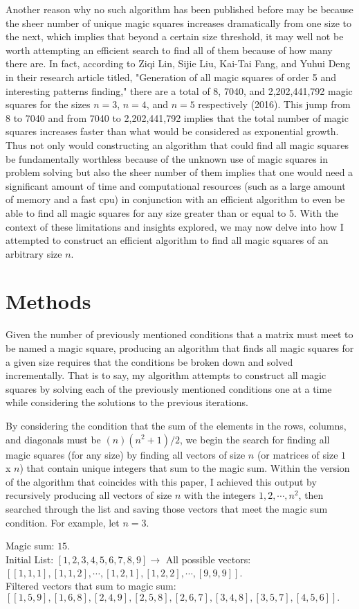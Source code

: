 \documentclass{article}
\begin{document}
    Another reason why no such algorithm has been published before may be because the sheer number of unique magic squares increases dramatically from one size to the next, which implies that beyond a certain size threshold, it may well not be worth attempting an efficient search to find all of them because of how many there are. In fact, according to Ziqi Lin, Sijie Liu, Kai-Tai Fang, and Yuhui Deng in their research article titled, "Generation of all magic squares of order 5 and interesting patterns finding," there are a total of 8, 7040, and 2,202,441,792 magic squares for the sizes $n = 3$, $n = 4$, and $n = 5$ respectively (2016). This jump from 8 to 7040 and from 7040 to 2,202,441,792 implies that the total number of magic squares increases faster than what would be considered as exponential growth. Thus not only would constructing an algorithm that could find all magic squares be fundamentally worthless because of the unknown use of magic squares in problem solving but also the sheer number of them implies that one would need a significant amount of time and computational resources (such as a large amount of memory and a fast cpu) in conjunction with an efficient algorithm to even be able to find all magic squares for any size greater than or equal to 5. With the context of these limitations and insights explored, we may now delve into how I attempted to construct an efficient algorithm to find all magic squares of an arbitrary size $n$. 
    
\section{Methods}
    Given the number of previously mentioned conditions that a matrix must meet to be named a magic square, producing an algorithm that finds all magic squares for a given size requires that the conditions be broken down and solved incrementally. That is to say, my algorithm attempts to construct all magic squares by solving each of the previously mentioned conditions one at a time while considering the solutions to the previous iterations.
    
    By considering the condition that the sum of the elements in the rows, columns, and diagonals must be $(n)(n^2 + 1)/2$, we begin the search for finding all magic squares (for any size) by finding all vectors of size $n$ (or matrices of size $1$ x $n$) that contain unique integers that sum to the magic sum. Within the version of the algorithm that coincides with this paper, I achieved this output by recursively producing all vectors of size $n$ with the integers $1,2,\cdots,n^2$, then searched through the list and saving those vectors that meet the magic sum condition. For example, let $n = 3$.
    \begin{center}
        Magic sum: $15$.\\
        Initial List: $[1, 2, 3, 4, 5, 6, 7, 8, 9] \xrightarrow[]{}$ All possible vectors: $[[1,1,1], [1,1,2],\cdots, [1,2,1],[1,2,2],\cdots, [9,9,9]].$\\
        Filtered vectors that sum to magic sum:$[[1, 5, 9], [1, 6, 8], [2, 4, 9], [2, 5, 8], [2, 6, 7], [3, 4, 8], [3, 5, 7], [4, 5, 6]].$ 
    \end{center}
     
\end{document}
